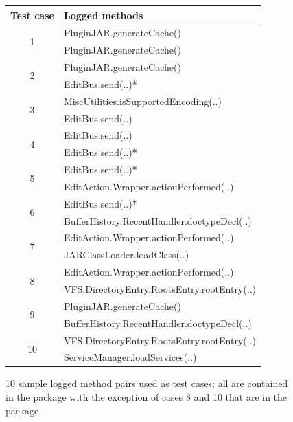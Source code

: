 \begin{figure}
  \centering
  \begin{tabular}{cl}
    \toprule
    Test case & Logged methods \\
    \midrule

    \multirow{2}{*}{{1}}&{PluginJAR.generateCache()}\\
                         &{PluginJAR.generateCache()}\\
    \midrule

    \multirow{2}{*}{2}&{PluginJAR.generateCache()}\\
                         &{EditBus.send(..)}*\\
    \midrule

    \multirow{2}{*}{3}&{MiscUtilities.isSupportedEncoding(..)}\\
                         &{EditBus.send(..)}\\
    \midrule

    \multirow{2}{*}{4}&{EditBus.send(..)}\\
                         &{EditBus.send(..)}*\\
    \midrule
    \multirow{2}{*}{5}&{EditBus.send(..)}*\\
                         &{EditAction.Wrapper.actionPerformed(..)}\\
    \midrule

    \multirow{2}{*}{6}&{EditBus.send(..)}*\\
                         &{BufferHistory.RecentHandler.doctypeDecl(..)}\\
    \midrule

    \multirow{2}{*}{7}&{EditAction.Wrapper.actionPerformed(..)}\\
                         &{JARClassLoader.loadClass(..)}\\
    \midrule

    \multirow{2}{*}{8}&{EditAction.Wrapper.actionPerformed(..)}\\
                         &{VFS.DirectoryEntry.RootsEntry.rootEntry(..)}\\
    \midrule

    \multirow{2}{*}{9}&{PluginJAR.generateCache()}\\
                         &{BufferHistory.RecentHandler.doctypeDecl(..)}\\
    \midrule

    \multirow{2}{*}{10}&{VFS.DirectoryEntry.RootsEntry.rootEntry(..)}\\
                         &{ServiceManager.loadServices(..)}\\
    \bottomrule

  \end{tabular}
  \caption{10 sample logged  method pairs used as test cases; all are contained in the \protect{} package with the exception of cases 8 and 10 that are in the \protect{} package.}
  \label{study2_test_cases}
\end{figure}





